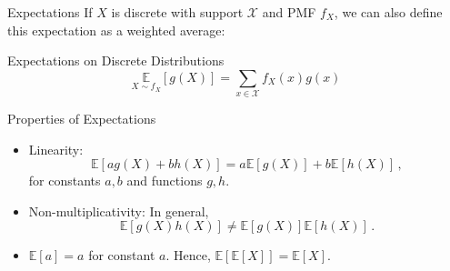 \documentclass[10pt]{beamer}
\begin{document}
\begin{frame}[fragile]{Expectations}
If \(X\) is discrete with support \(\mathcal{X}\) and PMF \(f_X\), we can also define this expectation as a weighted average:
\begin{alertblock}{Expectations on Discrete Distributions}
\begin{equation*}
    \underset{X \sim f_X}{\mathbb{E}}\left[g\left(X\right)\right] = \sum_{x \in \mathcal{X}} f_X\left(x\right)g\left(x\right)
\end{equation*}
\end{alertblock}


\end{frame}

\begin{frame}[fragile]{Properties of Expectations}
\begin{itemize}[<+->]
    \item Linearity:
        \begin{equation*}
            \mathbb{E}\left[ag\left(X\right) + bh\left(X\right)\right] = a\mathbb{E}\left[g\left(X\right)\right] + b\mathbb{E}\left[h\left(X\right)\right]\,,
        \end{equation*}
        for constants \(a, b\) and functions \(g, h\).
    \item Non-multiplicativity:
        In general,
        \begin{equation*}
            \mathbb{E}\left[g\left(X\right)h\left(X\right)\right] \neq \mathbb{E}\left[g\left(X\right)\right]\mathbb{E}\left[h\left(X\right)\right]\,.
        \end{equation*}
    \item \(\mathbb{E}\left[a\right] = a\) for constant \(a\). Hence, \(\mathbb{E}\left[\mathbb{E}\left[X\right]\right] = \mathbb{E}\left[X\right]\).
\end{itemize}
\end{frame}
\end{document}

